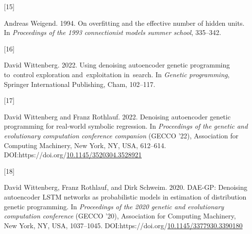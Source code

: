 \documentclass[
  11pt,
]{article}
\newlength{\cslhangindent}
\newlength{\csllabelwidth}
\newlength{\cslentryspacingunit} %
\newenvironment{CSLReferences}[2] %
 {%
  \setlength{\parindent}{0pt}
  \ifodd #1
  \let\oldpar\par
  \def\par{\hangindent=\cslhangindent\oldpar}
  \fi
  \setlength{\parskip}{#2\cslentryspacingunit}
 }%
 {}
\newcommand{\CSLLeftMargin}[1]{\parbox[t]{\csllabelwidth}{#1}}
\newcommand{\CSLRightInline}[1]{\parbox[t]{\linewidth - \csllabelwidth}{#1}\break}
\begin{document}
\begin{CSLReferences}{0}{0}
\leavevmode{}%
\CSLLeftMargin{{[}15{]} }%
\CSLRightInline{Andreas Weigend. 1994. On overfitting and the effective
number of hidden units. In \emph{Proceedings of the 1993 connectionist
models summer school}, 335--342.}

\leavevmode{}%
\CSLLeftMargin{{[}16{]} }%
\CSLRightInline{David Wittenberg. 2022. Using denoising autoencoder
genetic programming to~control exploration and~exploitation in~search.
In \emph{Genetic programming}, Springer International Publishing, Cham,
102--117.}

\leavevmode{}%
\CSLLeftMargin{{[}17{]} }%
\CSLRightInline{David Wittenberg and Franz Rothlauf. 2022. Denoising
autoencoder genetic programming for real-world symbolic regression. In
\emph{Proceedings of the genetic and evolutionary computation conference
companion} (GECCO '22), Association for Computing Machinery, New York,
NY, USA, 612--614.
DOI:https://doi.org/\href{https://doi.org/10.1145/3520304.3528921}{10.1145/3520304.3528921}}

\leavevmode{}%
\CSLLeftMargin{{[}18{]} }%
\CSLRightInline{David Wittenberg, Franz Rothlauf, and Dirk Schweim.
2020. DAE-GP: Denoising autoencoder LSTM networks as probabilistic
models in estimation of distribution genetic programming. In
\emph{Proceedings of the 2020 genetic and evolutionary computation
conference} (GECCO '20), Association for Computing Machinery, New York,
NY, USA, 1037--1045.
DOI:https://doi.org/\href{https://doi.org/10.1145/3377930.3390180}{10.1145/3377930.3390180}}

\end{CSLReferences}
\end{document}
